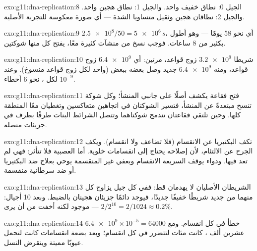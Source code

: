 \begin{solution}{exo:g11:dna-replication:8}
الجيل 0: نطاق خفيف واحد. والجيل 1: نطاق هجين واحد. والجيل 2: نطاقان
هجين وثقيل متساويا الشدة --- أي صورة معكوسة للتجربة الأصلية.
\end{solution}

\begin{solution}{exo:g11:dna-replication:9}
$\num{2.5e8}/50 = \num{5e6}\,\unit{s}$، أي نحو 58 يومًا --- وهو أطول
بكثير من 8 ساعات. فوجب نسخ  من منشآت كثيرة معًا، يفتح كل منها
شوكتين.
\end{solution}

\begin{solution}{exo:g11:dna-replication:10}
شريطا $\num{3.2e9}$ زوج قواعد، مرتين: أي $\num{6.4e9}$ زوج قواعد،
ومنه $\num{6.4e9}$  جديد وصل بعضه ببعض (واحد لكل زوج قواعد
منسوخ). وعند $10^{-9}$ لكل ، نحو 6 أخطاء.
\end{solution}

\begin{solution}{exo:g11:dna-replication:11}
فتح فقاعة يكشف أصلًا على جانبي المنشأ؛ وكل شوكة تنسخ مبتعدةً عن
المنشأ، فتسير الشوكتان في اتجاهين متعاكسين وتغطيان معًا المنطقة كلها.
وحين تلتقي فقاعتان تندمج شوكتاهما وتتصل الشرائط البنات طرفًا بطرف في
جزيئات متصلة.
\end{solution}

\begin{solution}{exo:g11:dna-replication:12}
تكف البكتيريا عن الانقسام (فلا تضاعف ولا انقسام). ويكف الجرح عن
الالتئام، لأن إصلاحه يحتاج إلى انقسامات خلوية. أما  العصبية فلا
تتأثر: فهي لم تعد  فيها. ودواء يوقف  السريعة الانقسام
ويعفي غير المنقسمة يوحي بعلاج ضد البكتيريا أو ضد  سرطانية
منقسمة.
\end{solution}

\begin{solution}{exo:g11:dna-replication:13}
الشريطان الأصليان لا يهدمان قط: ففي كل جيل يزاوج كل منهما من جديد
شريطًا خفيفًا جديدًا، فيوجد دائمًا جزيئان هجينان بالضبط. وبعد 10
أجيال: $2/2^{10} = 2/1024
\approx 0.2\%$ --- موجود لكنه أخفت من أن يرى.
\end{solution}

\begin{solution}{exo:g11:dna-replication:14}
$\num{6.4e9} \times 10^{-5} = \num{64000}$ خطأ في كل انقسام. ومع عشرين
ألف ، كانت مئات  لتتضرر في كل انقسام؛ وبعد بضعة
انقسامات كانت  لتحمل عيوبًا مميتة وينقرض النسل.
\end{solution}

